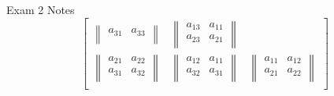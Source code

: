 \begin{examnotes}{Exam 2 Notes}
\begin{equation*}
\begin{bmatrix}
\begin{Vmatrix}
                a_{31} & a_{33} \\
            \end{Vmatrix} &
            \begin{Vmatrix}
                a_{13} & a_{11} \\
                a_{23} & a_{21} \\
            \end{Vmatrix} \\
            \begin{Vmatrix}
                a_{21} & a_{22} \\
                a_{31} & a_{32} \\
            \end{Vmatrix} &
            \begin{Vmatrix}
                a_{12} & a_{11} \\
                a_{32} & a_{31} \\
            \end{Vmatrix} & 
            \begin{Vmatrix}
                a_{11} & a_{12} \\
                a_{21} & a_{22} \\
            \end{Vmatrix} \\
        \end{bmatrix}
    \end{equation*}
\end{examnotes}